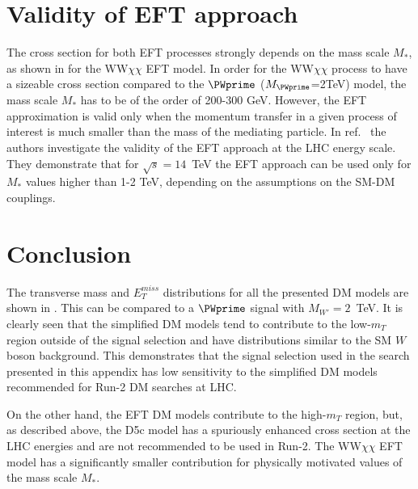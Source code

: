 





\section{Validity of EFT approach}

The cross section for both EFT processes strongly depends on the mass scale $M_{*}$,
as shown in  for the WW$\chi\chi$ EFT model.
In order for the WW$\chi\chi$ process to have a sizeable cross section compared to the $\PWprime$ ($M_{\PWprime}$=2TeV) model, 
the mass scale $M_{*}$ has to be of the order of 200-300 GeV. 
However, the EFT approximation is valid only when the momentum transfer in a given
process of interest is much smaller than the mass of the mediating
particle. 
In ref.~\cite{eft_validity_limits} the authors investigate the validity of the EFT approach at
the LHC energy scale. They demonstrate that for $\sqrt{s} = 14$~TeV the 
EFT approach can be used only for $M_{*}$ values higher than 1-2 TeV, depending on the assumptions on the SM-DM couplings.

\section{Conclusion}

The transverse mass and $E_{T}^{miss}$ distributions for all the presented DM models are shown in . This can be compared to a $\PWprime$ signal with $M_{W'} = 2$~TeV.
It is clearly seen that the simplified DM models tend to contribute to the low-$m_{T}$ region
outside of the signal selection and have distributions similar to the SM $W$ boson background.
This demonstrates that the signal selection used in the search presented in this appendix 
has low sensitivity to the simplified DM models recommended for Run-2 DM searches at LHC.

On the other hand, the EFT DM models contribute to the high-$m_{T}$ region, but, as described above, the D5c model has a spuriously enhanced cross section at the LHC energies and are not recommended to be used in Run-2. The WW$\chi\chi$ EFT model has a significantly smaller contribution for physically motivated values of the mass scale $M_{*}$.


